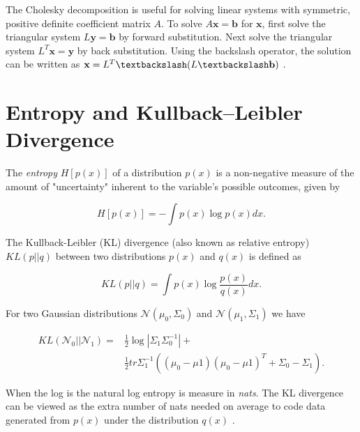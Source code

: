\documentclass[12pt,a4paper]{report}
\theoremstyle{definition}
\begin{document}
The Cholesky decomposition is useful for solving linear systems with symmetric, positive definite coefficient matrix $A$. 
To solve $A\textbf{x} = \textbf{b}$ for $\textbf{x}$, first solve the triangular system $L\textbf{y} = \textbf{b}$ by forward substitution. 
Next solve the triangular system $L^T\textbf{x} = \textbf{y}$ by back substitution.
Using the backslash operator, the solution can be written as $\textbf{x} = L^T \textbackslash (L \textbackslash \textbf{b})$ \citep{RasmussenWilliams2006}.

\section{Entropy and Kullback–Leibler Divergence} \label{sec:KLDiv}

The \emph{entropy} $H[p(x)]$ of a distribution $p(x)$ is a non-negative measure of the amount of "uncertainty" inherent to the variable's possible outcomes, given by

\begin{equation}
	H[p(x)]  = - \int p(x) \log p(x) dx.
\end{equation}

The Kullback-Leibler (KL) divergence (also known as relative entropy) $KL(p || q)$ between two distributions $p(x)$ and $q(x)$ is defined as 

\begin{equation}
	KL(p || q) = \int p(x) \log \frac{p(x)}{q(x)} dx.
\end{equation}

For two Gaussian distributions $\mathcal{N}(\mu_{0}, \Sigma_{0})$ and $\mathcal{N}(\mu_{1}, \Sigma_{1})$ we have

\begin{equation}
	\begin{aligned}
		KL(\mathcal{N}_{0} || \mathcal{N}_{1}) = &\frac{1}{2} \log |\Sigma_{1}\Sigma_{0}^{-1}| + \\
		&\frac{1}{2} tr \Sigma_{1}^{-1} ((\mu_{0} - \mu{1})(\mu_{0} - \mu{1})^T  + \Sigma_{0} - \Sigma_{1}).
	\end{aligned}
\end{equation}

When the log is the natural log entropy is measure in \emph{nats}. The KL divergence can be viewed as the extra number of nats needed on average to code data generated from $p(x)$ under the distribution $q(x)$ \citep{RasmussenWilliams2006}.

\end{document}
